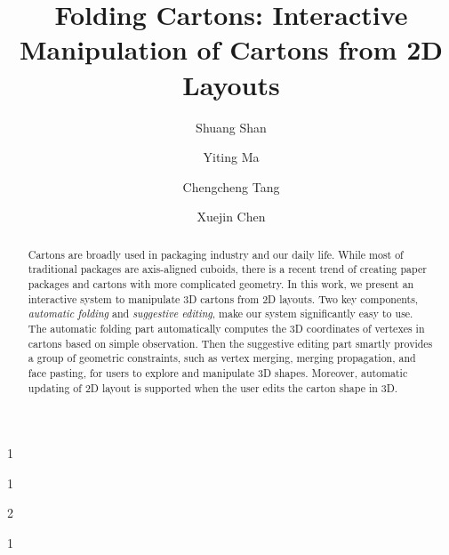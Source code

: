 \documentclass[submission]{gmp2018}
\begin{document}
%
%
\title{Folding Cartons: Interactive Manipulation of Cartons from 2D Layouts}

%
%

%
%
\author{Shuang Shan}{1}
\author{Yiting Ma}{1}
\author{Chengcheng Tang}{2}
\author{Xuejin Chen}{1}

%
%

%
%
 



\newcommand{\comments}[1]{}
\newcommand{\cxj}[1]{\textcolor{red}{(xuejin:#1)}}
\newcommand{\xjmd}[1]{\textcolor{purple}{#1}}
\newcommand{\vo}{\hat{\mathbf{v}}}
\newcommand{\vn}{\mathbf{v}}
\newcommand{\vset}{\mathbb{V}}


\newcommand{\reply}[1]{\textcolor{blue}{#1}}

\maketitle

\begin{abstract}
Cartons are broadly used in packaging industry and our daily life. While most of traditional packages are axis-aligned cuboids, there is a recent trend of creating paper packages and cartons with more complicated geometry. In this work, we present an interactive system to manipulate 3D cartons from 2D layouts. Two key components, \emph{automatic folding} and \emph{suggestive editing}, make our system significantly easy to use. 
The automatic folding part automatically computes the 3D coordinates of vertexes in cartons based on simple observation. Then the suggestive editing part smartly provides a group of geometric constraints, such as vertex merging, merging propagation, and face pasting, for users to explore and manipulate 3D shapes.
Moreover, automatic updating of 2D layout is supported when the user edits the carton shape in 3D.  
\end{abstract}
\end{document}
